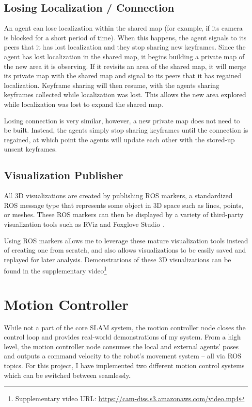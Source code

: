 \subsection{Losing Localization / Connection}
\label{sec:losing-localization-or-connection}
An agent can lose localization within the shared map (for example, if its camera is blocked for a short period of time). When this happens, the agent signals to its peers that it has lost localization and they stop sharing new keyframes. Since the agent has lost localization in the shared map, it begins building a private map of the new area it is observing. If it revisits an area of the shared map, it will merge its private map with the shared map and signal to its peers that it has regained localization. Keyframe sharing will then resume, with the agents sharing keyframes collected while localization was lost. This allows the new area explored while localization was lost to expand the shared map.

Losing connection is very similar, however, a new private map does not need to be built. Instead, the agents simply stop sharing keyframes until the connection is regained, at which point the agents will update each other with the stored-up unsent keyframes.

\subsection{Visualization Publisher}
\label{sec:visualization-publisher}
All 3D visualizations are created by publishing ROS markers, a standardized ROS message type that represents some object in 3D space such as lines, points, or meshes. These ROS markers can then be displayed by a variety of third-party visualization tools such as RViz \autocite{10.1007/s11235-015-0034-5} and Foxglove Studio \autocite{foxgloveStudio}.

Using ROS markers allows me to leverage these mature visualization tools instead of creating one from scratch, and also allows visualizations to be easily saved and replayed for later analysis. Demonstrations of these 3D visualizations can be found in the supplementary video\footnote[1]{Supplementary video URL: \url{https://cam-diss.s3.amazonaws.com/video.mp4}}

\section{Motion Controller}
\label{sec:motion-controller}
While not a part of the core SLAM system, the motion controller node closes the control loop and provides real-world demonstrations of my system. From a high level, the motion controller node consumes the local and external agents' poses and outputs a command velocity to the robot's movement system – all via ROS topics. For this project, I have implemented two different motion control systems which can be switched between seamlessly.

